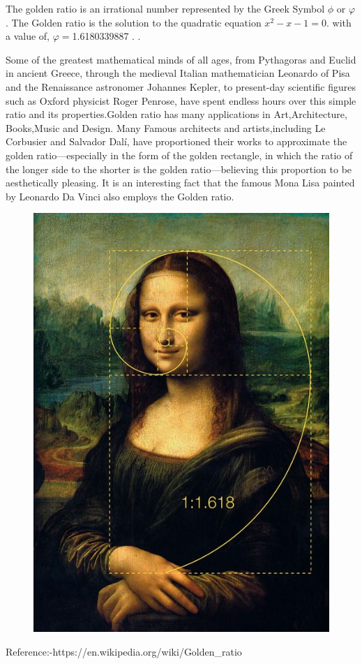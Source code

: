 \documentclass[12pt]{article}
\begin{document}
The golden ratio is an irrational number represented by the Greek Symbol $\phi$ or $\varphi$. The Golden ratio is the solution to the quadratic equation $x^2-x-1=0$. with a value of,
$\varphi=$1.6180339887 . .
\par
Some of the greatest mathematical minds of all ages, from Pythagoras and Euclid in ancient Greece, through the medieval Italian mathematician Leonardo of Pisa and the Renaissance astronomer Johannes Kepler, to present-day scientific figures such as Oxford physicist Roger Penrose, have spent endless hours over this simple ratio and its properties.Golden ratio has many applications in Art,Architecture, Books,Music and Design.
Many Famous architects and artists,including Le Corbusier and Salvador Dalí, have proportioned their works to approximate the golden ratio—especially in the form of the golden rectangle, in which the ratio of the longer side to the shorter is the golden ratio—believing this proportion to be aesthetically pleasing.
It is an interesting fact that the famous Mona Lisa painted by Leonardo Da Vinci also employs the Golden ratio.
\begin{figure}[h]
    \centering
    \includegraphics[scale=0.20]{text.jpg}
\end{figure}


Reference:-https://en.wikipedia.org/wiki/Golden_ratio
\end{document}
